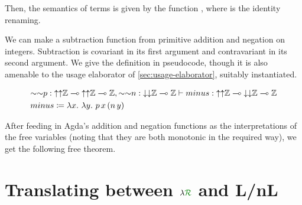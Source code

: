 Then, the semantics of terms is given by the function
\AgdaSpace{}\AgdaSpace{}%
, where  is the identity renaming.


\begin{example}\label{thm:minus}
  We can make a subtraction function from primitive addition and negation on
  integers.
  Subtraction is covariant in its first argument and contravariant in its
  second argument.
  We give the definition in pseudocode, though it is also amenable to the
  usage elaborator of \cref{sec:usage-elaborator}, suitably instantiated.

  \begin{align*}
    &{\sim\sim}p :
      {\uparrow\uparrow}\mathbb Z \multimap
      {\uparrow\uparrow}\mathbb Z \multimap \mathbb Z,
      {\sim\sim}n : {\downarrow\downarrow}\mathbb Z \multimap \mathbb Z
      \vdash \mathnormal{minus} :
      {\uparrow\uparrow}\mathbb Z \multimap
      {\downarrow\downarrow}\mathbb Z \multimap
      \mathbb Z
    \\
    &\mathnormal{minus} \coloneqq \lambda x.~\lambda y.~p\,x\,(n\,y)
  \end{align*}

  After feeding in Agda's addition and negation functions as the
  interpretations of the free variables (noting that they are both monotonic
  in the required way), we get the following free theorem.





\end{example}

\section{Translating between $\name$ and L/nL}\label{sec:lnl}

